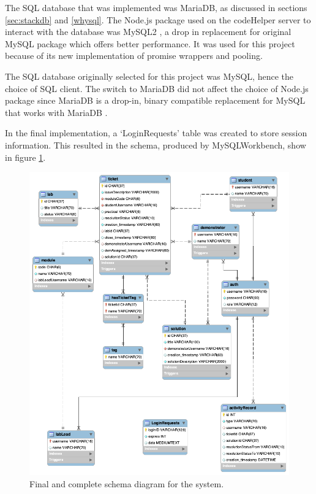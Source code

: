 The SQL database that was implemented was MariaDB, as discussed in sections \ref{sec:stackdb} and \ref{whysql}. The Node.js package used on the codeHelper server to interact with the database was MySQL2 \cite{npmmysql2}, a drop in replacement for original MySQL package which offers better performance. It was used for this project because of its new implementation of promise wrappers and pooling.

The SQL database originally selected for this project was MySQL, hence the choice of SQL client. The switch to MariaDB did not affect the choice of Node.js package since MariaDB is a drop-in, binary compatible replacement for MySQL \cite{Bartholomew} that works with MariaDB \cite{npmmariadb}.

In the final implementation, a `LoginRequests' table was created to store session information. This resulted in the schema, produced by MySQLWorkbench, show in figure \ref{fig:relationalschemafinal}.

\begin{figure}[H]
    \centering
    \includegraphics[width=\textwidth]{8implementation/images/schemaFinal.png}
    \caption{Final and complete schema diagram for the system.}
    \label{fig:relationalschemafinal}
\end{figure}

